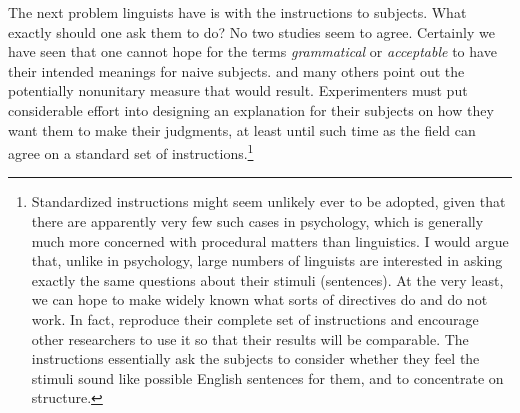 \enlargethispage{\baselineskip}
 The next problem linguists have is with the instructions to subjects. What exactly should one ask them to do? No two studies seem to agree. Certainly we have seen that one cannot hope for the terms \textit{grammatical} or \textit{acceptable} to have their intended meanings for naive subjects. \citet{Chaudron1983} and many others point out the potentially nonunitary measure that would result. Experimenters must put considerable effort into designing an explanation for their subjects on how they want them to make their judgments, at least until such time as the field can agree on a standard set of instructions.\footnote{ Standardized instructions might seem unlikely ever to be adopted, given that there are apparently very few such cases in psychology, which is generally much more concerned with procedural matters than linguistics. I would argue that, unlike in psychology, large numbers of linguists are interested in asking exactly the same questions about their stimuli (sentences). At the very least, we can hope to make widely known what sorts of directives do and do not work. In fact, \citet{BleyVromanEtAl1988} reproduce their complete set of instructions and encourage other researchers to use it so that their results will be comparable. The instructions essentially ask the subjects to consider whether they feel the stimuli sound like possible English sentences for them, and to concentrate on structure.
 }
